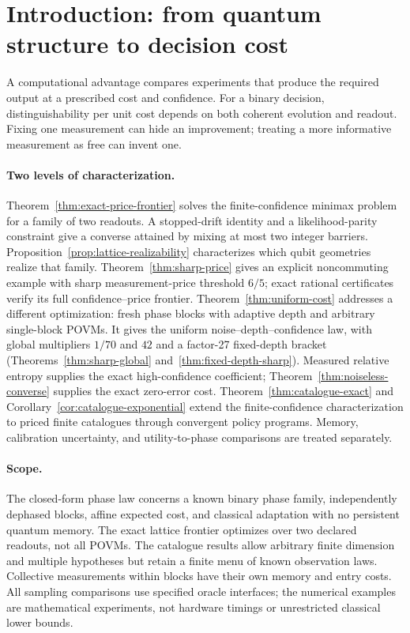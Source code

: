 \documentclass[11pt,a4paper]{article}
\theoremstyle{definition}
\theoremstyle{remark}
\numberwithin{equation}{section}
\begin{document}
\section{Introduction: from quantum structure to decision cost}\label{sec:research}
A computational advantage compares experiments that produce the required
output at a prescribed cost and confidence. For a binary decision,
distinguishability per unit cost depends on both coherent evolution and
readout. Fixing one measurement can hide an improvement; treating a more
informative measurement as free can invent one.

\paragraph{Two levels of characterization.}
Theorem~\ref{thm:exact-price-frontier} solves the finite-confidence
minimax problem for a family of two readouts. A stopped-drift identity
and a likelihood-parity constraint give a converse attained by mixing
at most two integer barriers. Proposition~\ref{prop:lattice-realizability}
characterizes which qubit geometries realize that family.
Theorem~\ref{thm:sharp-price} gives an explicit noncommuting example with
sharp measurement-price threshold $6/5$; exact rational certificates
verify its full confidence--price frontier.
Theorem~\ref{thm:uniform-cost} addresses a different optimization: fresh
phase blocks with adaptive depth and arbitrary single-block POVMs. It
gives the uniform noise--depth--confidence law, with global multipliers
$1/70$ and $42$ and a factor-27 fixed-depth bracket
(Theorems~\ref{thm:sharp-global} and~\ref{thm:fixed-depth-sharp}).
Measured relative entropy supplies the exact high-confidence coefficient;
Theorem~\ref{thm:noiseless-converse} supplies the exact zero-error cost.
Theorem~\ref{thm:catalogue-exact} and
Corollary~\ref{cor:catalogue-exponential} extend the finite-confidence
characterization to priced finite catalogues through convergent policy
programs. Memory, calibration uncertainty, and utility-to-phase
comparisons are treated separately.

\paragraph{Scope.}
The closed-form phase law concerns a known binary phase family,
independently dephased blocks, affine expected cost, and classical
adaptation with no persistent quantum memory. The exact lattice frontier
optimizes over two declared readouts, not all POVMs. The catalogue results
allow arbitrary finite dimension and multiple hypotheses but retain a
finite menu of known observation laws. Collective measurements within
blocks have their own memory and entry costs. All sampling comparisons
use specified oracle interfaces; the numerical examples are mathematical
experiments, not hardware timings or unrestricted classical lower bounds.
\end{document}
